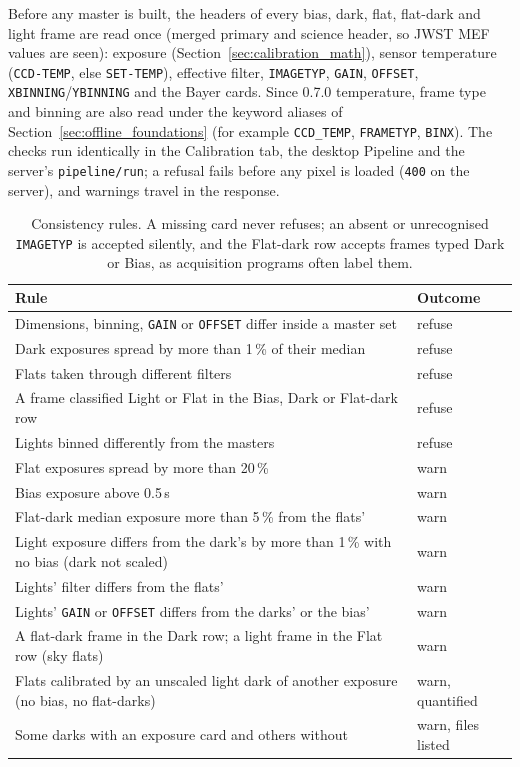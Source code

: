 \documentclass[11pt,a4paper]{article}
\newcommand{\code}[1]{\texttt{\small #1}}
\begin{document}
    Before any master is built, the headers of every bias, dark, flat, flat-dark and light frame are read once (merged primary and science header, so JWST MEF values are seen): exposure (Section~\ref{sec:calibration_math}), sensor temperature (\code{CCD-TEMP}, else \code{SET-TEMP}), effective filter, \code{IMAGETYP}, \code{GAIN}, \code{OFFSET}, \code{XBINNING}/\code{YBINNING} and the Bayer cards. Since 0.7.0 temperature, frame type and binning are also read under the keyword aliases of Section~\ref{sec:offline_foundations} (for example \code{CCD\_TEMP}, \code{FRAMETYP}, \code{BINX}). The checks run identically in the Calibration tab, the desktop Pipeline and the server's \code{pipeline/run}; a refusal fails before any pixel is loaded (\code{400} on the server), and warnings travel in the response.

    \begin{table}[H]
        \centering
        \small
        \begin{tabularx}{\textwidth}{Xl}
            \toprule
            \textbf{Rule} & \textbf{Outcome} \\
            \midrule
            Dimensions, binning, \code{GAIN} or \code{OFFSET} differ inside a master set & refuse \\
            Dark exposures spread by more than 1\,\% of their median & refuse \\
            Flats taken through different filters & refuse \\
            A frame classified Light or Flat in the Bias, Dark or Flat-dark row & refuse \\
            Lights binned differently from the masters & refuse \\
            Flat exposures spread by more than 20\,\% & warn \\
            Bias exposure above 0.5\,s & warn \\
            Flat-dark median exposure more than 5\,\% from the flats' & warn \\
            Light exposure differs from the dark's by more than 1\,\% with no bias (dark not scaled) & warn \\
            Lights' filter differs from the flats' & warn \\
            Lights' \code{GAIN} or \code{OFFSET} differs from the darks' or the bias' & warn \\
            A flat-dark frame in the Dark row; a light frame in the Flat row (sky flats) & warn \\
            Flats calibrated by an unscaled light dark of another exposure (no bias, no flat-darks) & warn, quantified \\
            Some darks with an exposure card and others without & warn, files listed \\
            \bottomrule
        \end{tabularx}
        \caption{Consistency rules. A missing card never refuses; an absent or unrecognised \code{IMAGETYP} is accepted silently, and the Flat-dark row accepts frames typed Dark or Bias, as acquisition programs often label them.}
    \end{table}
\end{document}
